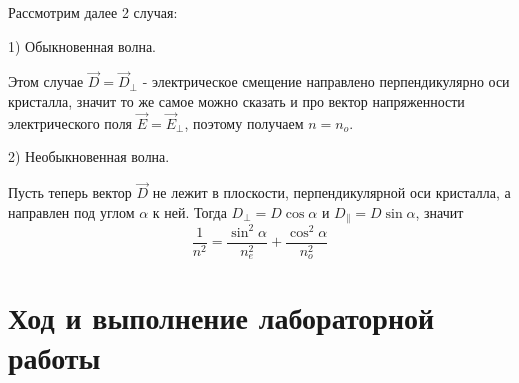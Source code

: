 \documentclass[a4paper,12pt]{article}
\begin{document}
Рассмотрим далее 2 случая:

1) Обыкновенная волна. 

Этом случае $\vec D = \vec D_ \bot$ - электрическое смещение направлено перпендикулярно оси кристалла, значит то же самое можно сказать и про вектор напряженности электрического поля  $\vec E = \vec E_ \bot$, поэтому получаем $n = n_o$.

2) Необыкновенная волна.

Пусть теперь вектор $\vec D$ не лежит в плоскости, перпендикулярной оси кристалла, а направлен под углом $\alpha$ к ней. Тогда $D_\bot = D\cos\alpha$ и $D_\parallel = D\sin\alpha$, значит
\[\frac{1}{{{n^2}}} = \frac{{{{\sin }^2}\alpha }}{{n_e^2}} + \frac{{{{\cos }^2}\alpha }}{{n_o^2}}\]
\newpage 
\section{Ход и выполнение лабораторной работы}
\end{document}
